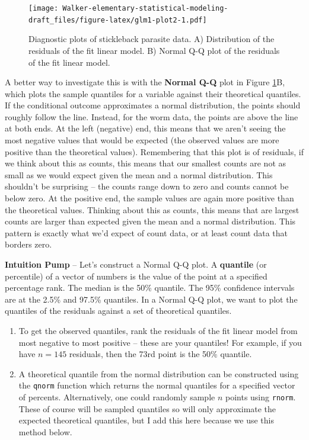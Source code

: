 \documentclass[]{book}
\providecommand{\tightlist}{%
  \setlength{\itemsep}{0pt}\setlength{\parskip}{0pt}}
\begin{document}
\begin{figure}
\centering
\texttt{[image: Walker-elementary-statistical-modeling-draft\_files/figure-latex/glm1-plot2-1.pdf]}
\caption{\label{fig:glm1-plot2}Diagnostic plots of stickleback parasite data. A) Distribution of the residuals of the fit linear model. B) Normal Q-Q plot of the residuals of the fit linear model.}
\end{figure}

A better way to investigate this is with the \textbf{Normal Q-Q} plot in Figure \ref{fig:glm1-plot2}B, which plots the sample quantiles for a variable against their theoretical quantiles. If the conditional outcome approximates a normal distribution, the points should roughly follow the line. Instead, for the worm data, the points are above the line at both ends. At the left (negative) end, this means that we aren't seeing the most negative values that would be expected (the observed values are more positive than the theoretical values). Remembering that this plot is of residuals, if we think about this as counts, this means that our smallest counts are not as small as we would expect given the mean and a normal distribution. This shouldn't be surprising -- the counts range down to zero and counts cannot be below zero. At the positive end, the sample values are again more positive than the theoretical values. Thinking about this as counts, this means that are largest counts are larger than expected given the mean and a normal distribution. This pattern is exactly what we'd expect of count data, or at least count data that borders zero.

\textbf{Intuition Pump} -- Let's construct a Normal Q-Q plot. A \textbf{quantile} (or percentile) of a vector of numbers is the value of the point at a specified percentage rank. The median is the 50\% quantile. The 95\% confidence intervals are at the 2.5\% and 97.5\% quantiles. In a Normal Q-Q plot, we want to plot the quantiles of the residuals against a set of theoretical quantiles.

\begin{enumerate}
\def\labelenumi{\arabic{enumi}.}
\tightlist
\item
  To get the observed quantiles, rank the residuals of the fit linear model from most negative to most positive -- these are your quantiles! For example, if you have \(n=145\) residuals, then the 73rd point is the 50\% quantile.
\item
  A theoretical quantile from the normal distribution can be constructed using the \texttt{qnorm} function which returns the normal quantiles for a specified vector of percents. Alternatively, one could randomly sample \(n\) points using \texttt{rnorm}. These of course will be sampled quantiles so will only approximate the expected theoretical quantiles, but I add this here because we use this method below.
\end{enumerate}
\end{document}
